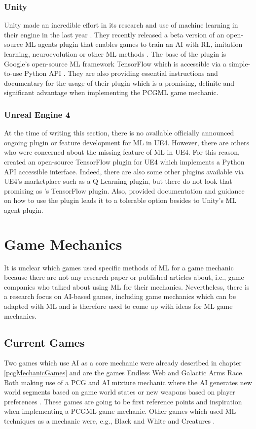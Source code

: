 \documentclass[MGS,Master,english]{twbook}%
\begin{document}
\subsubsection{Unity}
Unity made an incredible effort in its research and use of machine learning in their engine in the last year \cite{unity::ml}. They recently released a beta version of an open-source ML agents plugin that enables games to train an AI with \ac{RL}, imitation learning, neuroevolution or other ML methods \cite{unity::mlGithub}. The base of the plugin is Google’s open-source ML framework TensorFlow \cite{api::tensorFlow} which is accessible via a simple-to-use Python \ac{API} \cite{unity::mlGithub}. They are also providing essential instructions and documentary for the usage of their plugin which is a promising, definite and significant advantage when implementing the PCGML game mechanic.

\subsubsection{Unreal Engine 4}
At the time of writing this section, there is no available officially announced ongoing plugin or feature development for ML in \ac{UE4}. However, there are others who were concerned about the missing feature of ML in UE4. For this reason, \cite{ue4::tensorFlowPlugin} created an open-source TensorFlow plugin for UE4 which implements a Python API accessible interface. Indeed, there are also some other plugins available via UE4's marketplace such as a Q-Learning plugin, but there do not look that promising as \cite{ue4::tensorFlowPlugin}'s TensorFlow plugin. Also, provided documentation and guidance on how to use the plugin leads it to a tolerable option besides to Unity’s ML agent plugin.

\section{Game Mechanics}
It is unclear which games used specific methods of ML for a game mechanic because there are not any research paper or published articles about, i.e., game companies who talked about using ML for their mechanics. Nevertheless, there is a research focus on AI-based games, including game mechanics which can be adapted with ML and is therefore used to come up with ideas for ML game mechanics. 

\subsection{Current Games}
Two games which use AI as a core mechanic were already described in chapter \ref{pcgMechanicGames} and are the games Endless Web and Galactic Arms Race. Both making use of a PCG and AI mixture mechanic where the AI generates new world segments based on game world states \cite{pcg::endlessWeb} or new weapons based on player preferences \cite{pcg::galacticArmsRace}. These games are going to be first reference points and inspiration when implementing a PCGML game mechanic. Other games which used ML techniques as a mechanic were, e.g., Black and White and Creatures \cite{ml::mostInfluentalAiGames}. 
\end{document}
